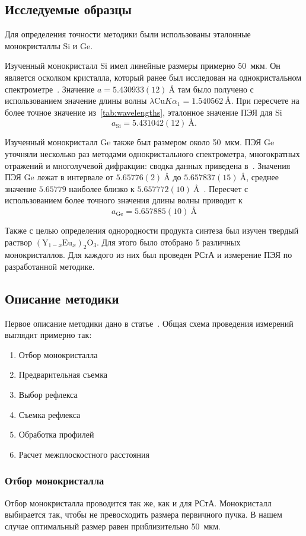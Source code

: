 \documentclass[a4paper,14pt]{extarticle}
\newcommand{\unit}[1]{ \ \text{#1}}
\newcommand{\YEu}{${(\text{Y}_{1-x}\text{Eu}_x)}_2\text{O}_3$}
\begin{document}
\subsection{Исследуемые образцы}
Для определения точности методики были использованы эталонные монокристаллы Si и Ge.

Изученный монокристалл Si имел линейные размеры примерно 50~мкм.
Он является осколком кристалла, который ранее был исследован на однокристальном спектрометре~\cite{Lisoivan:1982}.
Значение $a = 5.430933(12)\unit{\AA}$ там было получено с использованием значение длины волны $\lambda \text{Cu} K \alpha_1 = 1.540562\unit{\AA}$.
При пересчете на более точное значение из~\ref{tab:wavelengths}, эталонное значение ПЭЯ для Si
\[ a_\text{Si} = 5.431042 (12)\unit{\AA}. \]

Изученный монокристалл Ge также был размером около 50~мкм.
ПЭЯ Ge уточняли несколько раз методами однокристального спектрометра, многократных отражений и многолучевой дифракции: сводка данных приведена в~\cite{Lisoivan:1982}.
Значения ПЭЯ Ge лежат в интервале от $5.65776 (2)\unit{\AA}$ до $5.657837 (15)\unit{\AA}$, среднее значение $5.65779$ наиболее близко к $5.657772 (10)\unit{\AA}$~\cite{Cooper:1962}.
Пересчет с использованием более точного значения длины волны приводит к
\[ a_\text{Ge} = 5.657885 (10)\unit{\AA} \]

Также с целью определения однородности продукта синтеза был изучен твердый раствор \YEu.
Для этого было отобрано 5 различных монокристаллов.
Для каждого из них был проведен РСтА и измерение ПЭЯ по разработанной методике.
\subsection{Описание методики}
Первое описание методики дано в статье~\cite{Kudryavtsev:2024:YEu}.
Общая схема проведения измерений выглядит примерно так:
\begin{enumerate}
    \item Отбор монокристалла
    \item Предварительная съемка
    \item Выбор рефлекса
    \item Съемка рефлекса
    \item Обработка профилей
    \item Расчет межплоскостного расстояния
\end{enumerate}
\subsubsection{Отбор монокристалла}
Отбор монокристалла проводится так же, как и для РСтА.
Монокристалл выбирается так, чтобы не превосходить размера первичного пучка.
В нашем случае оптимальный размер равен приблизительно 50~мкм.
\end{document}
